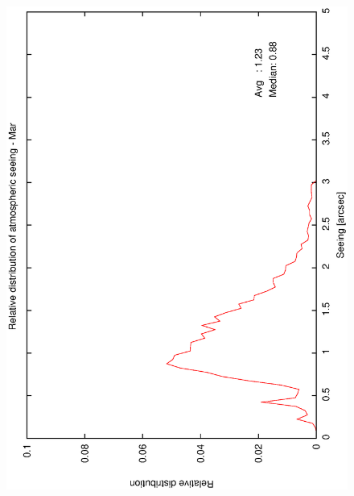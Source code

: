 {{\begin{figure}[htbp]
\begin{center}
{   \includegraphics[scale=0.25, angle=-90]{figures/ecs/corr_see_dist_mar.eps}
  }
 \subfigure[] {
   \label{fig:see_dist_apr}
}
\end{center}
\end{figure}}}
